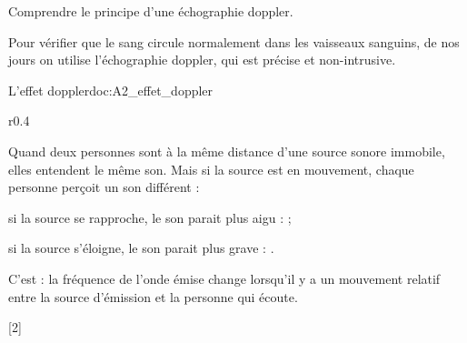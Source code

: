 \teteTermStssImag
{}


\begin{objectifs}
  \item Comprendre le principe d'une échographie doppler.
\end{objectifs}

\begin{contexte}
  Pour vérifier que le sang circule normalement dans les vaisseaux sanguins, de nos jours on utilise l'échographie doppler, qui est précise et non-intrusive.
  
\end{contexte}


\begin{doc}{L'effet doppler}{doc:A2_effet_doppler}
  \begin{wrapfigure}[4]{r}{0.4\linewidth}
    \centering
    \vspace*{-35pt}
  \end{wrapfigure}
  
  Quand deux personnes sont à la même distance d'une source sonore immobile, elles entendent le même son.
  Mais si la source est en mouvement, chaque personne perçoit un son différent :
  \begin{listePoints}
    \item si la source se rapproche, le son parait plus aigu :  ;
    \item si la source s'éloigne, le son parait plus grave : .
  \end{listePoints}
  
  \begin{importants}  
    C'est  : la fréquence de l'onde émise change lorsqu'il y a un mouvement relatif entre la source d'émission et la personne qui écoute.
  \end{importants}
\end{doc}


[2]

